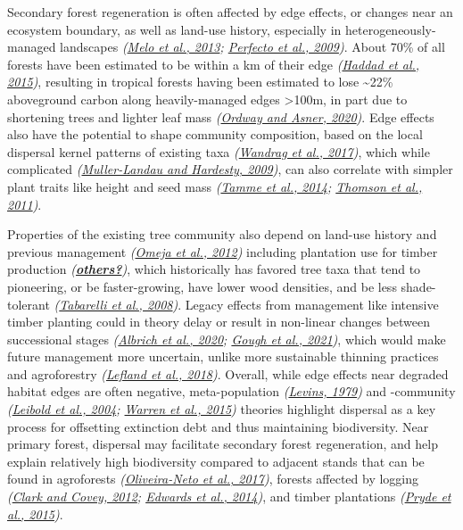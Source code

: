 \documentclass[
  12pt,
]{article}
\begin{document}
Secondary forest regeneration is often affected by edge effects, or changes near an ecosystem boundary, as well as land-use history, especially in heterogeneously-managed landscapes \emph{(\protect\hyperlink{ref-melo13}{Melo et al., 2013}; \protect\hyperlink{ref-perfecto09}{Perfecto et al., 2009})}.
About 70\% of all forests have been estimated to be within a km of their edge \emph{(\protect\hyperlink{ref-haddad15}{Haddad et al., 2015})}, resulting in tropical forests having been estimated to lose \textasciitilde22\% aboveground carbon along heavily-managed edges \textgreater100m, in part due to shortening trees and lighter leaf mass \emph{(\protect\hyperlink{ref-ordway20}{Ordway and Asner, 2020})}.
Edge effects also have the potential to shape community composition, based on the local dispersal kernel patterns of existing taxa \emph{(\protect\hyperlink{ref-wandrag17}{Wandrag et al., 2017})}, which while complicated \emph{(\protect\hyperlink{ref-muller-landau09}{Muller-Landau and Hardesty, 2009})}, can also correlate with simpler plant traits like height and seed mass \emph{(\protect\hyperlink{ref-tamme14}{Tamme et al., 2014}; \protect\hyperlink{ref-thomson11}{Thomson et al., 2011})}.

Properties of the existing tree community also depend on land-use history and previous management \emph{(\protect\hyperlink{ref-omeja12}{Omeja et al., 2012})} including plantation use for timber production \emph{(\protect\hyperlink{ref-others}{\textbf{others?}})}, which historically has favored tree taxa that tend to pioneering, or be faster-growing, have lower wood densities, and be less shade-tolerant \emph{(\protect\hyperlink{ref-tabarelli08}{Tabarelli et al., 2008})}.
Legacy effects from management like intensive timber planting could in theory delay or result in non-linear changes between successional stages \emph{(\protect\hyperlink{ref-albrich20}{Albrich et al., 2020}; \protect\hyperlink{ref-gough21}{Gough et al., 2021})}, which would make future management more uncertain, unlike more sustainable thinning practices and agroforestry \emph{(\protect\hyperlink{ref-lefland18}{Lefland et al., 2018})}.
Overall, while edge effects near degraded habitat edges are often negative, meta-population \emph{(\protect\hyperlink{ref-levins79}{Levins, 1979})} and -community \emph{(\protect\hyperlink{ref-leibold04}{Leibold et al., 2004}; \protect\hyperlink{ref-warren15}{Warren et al., 2015})} theories highlight dispersal as a key process for offsetting extinction debt and thus maintaining biodiversity.
Near primary forest, dispersal may facilitate secondary forest regeneration, and help explain relatively high biodiversity compared to adjacent stands that can be found in agroforests \emph{(\protect\hyperlink{ref-oliveira-neto17}{Oliveira-Neto et al., 2017})}, forests affected by logging \emph{(\protect\hyperlink{ref-clark12}{Clark and Covey, 2012}; \protect\hyperlink{ref-edwards14}{Edwards et al., 2014})}, and timber plantations \emph{(\protect\hyperlink{ref-pryde15}{Pryde et al., 2015})}.
\end{document}

